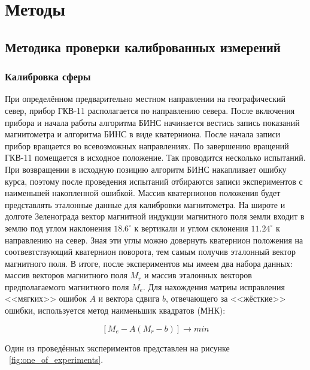 \documentclass[a4paper,12pt]{article}
\begin{document}
\section{Методы}
\subsection{Методика проверки калиброванных измерений}
\subsubsection{Калибровка сферы}
При определённом предварительно местном направлении на географический север, прибор ГКВ-11 располагается по направлению севера. После включения прибора и начала работы алгоритма БИНС начинается вестись запись показаний магнитометра и алгоритма БИНС в виде кватерниона. После начала записи прибор вращается во всевозможных направлениях. По завершению вращений ГКВ-11 помещается в исходное положение. Так проводится несколько испытаний. При возвращении в исходную позицию алгоритм БИНС накапливает ошибку курса, поэтому после проведения испытаний отбираются записи экспериментов с наименьшей накопленной ошибкой. Массив кватернионов положения будет представлять эталонные данные для калибровки магнитометра. На широте и долготе Зеленограда вектор магнитной индукции магнитного поля земли входит в землю под углом наклонения  $18.6^\circ$ к вертикали и углом склонения $11.24^\circ$ к направлению на север. Зная эти углы можно  довернуть кватернион положения на соотвевтствующий кватернион поворота, тем самым получив эталонный вектор магнитного поля. 
В итоге, после экспериментов мы имеем два набора данных: массив векторов магнитного поля $M_r$ и массив эталонных векторов предполагаемого магнитного поля $M_e$. Для нахождения матриы исправления <<мягких>>  ошибок $A$ и вектора сдвига $b$, отвечающего за <<жёсткие>>  ошибки, используется метод наименьшик квадратов (МНК):

\[ \left[ M_e - A\left(
M_r - b \right)
\right] \rightarrow min
\]

Один из проведённых экспериментов представлен на рисунке ~\ref{fig:one_of_experiments}.
\end{document}
